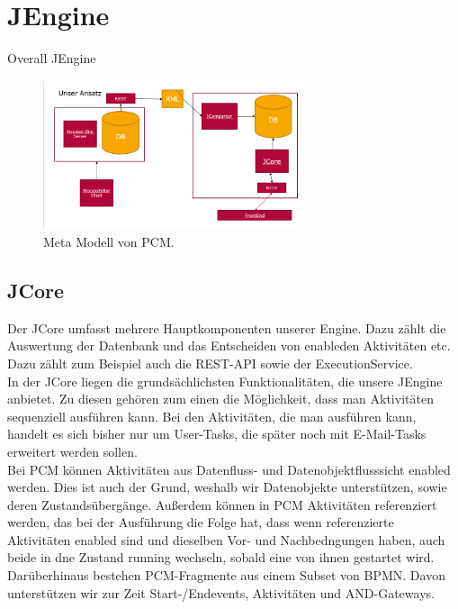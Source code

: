 \documentclass{template/ecsreport}      %
\begin{document}
%
%
\section{JEngine}
Overall JEngine

\begin{figure}
\centering
\includegraphics[width=3in]{img/JEngine_overview.png}
\caption{Meta Modell von PCM.}
\label{fig:PCMmetaModell}
\end{figure}


%
%
\subsection{JCore}
Der JCore umfasst mehrere Hauptkomponenten unserer Engine. Dazu zählt die Auswertung der Datenbank und das Entscheiden von enableden Aktivitäten etc.\\
Dazu zählt zum Beispiel auch die REST-API sowie der ExecutionService.\\
In der JCore liegen die grundsächlichsten Funktionalitäten, die unsere JEngine anbietet. Zu diesen gehören zum einen die Möglichkeit, dass man Aktivitäten sequenziell ausführen kann. Bei den Aktivitäten, die man ausführen kann, handelt es sich bisher nur um User-Tasks, die später noch mit E-Mail-Tasks erweitert werden sollen.\\
Bei PCM können Aktivitäten aus Datenfluss- und Datenobjektflusssicht enabled werden. Dies ist auch der Grund, weshalb wir Datenobjekte unterstützen, sowie deren Zustandsübergänge. Außerdem können in PCM Aktivitäten referenziert werden, das bei der Ausführung die Folge hat, dass wenn referenzierte Aktivitäten enabled sind und dieselben Vor- und Nachbedngungen haben, auch beide in dne Zustand running wechseln, sobald eine von ihnen gestartet wird.\\
Darüberhinaus bestehen PCM-Fragmente aus einem Subset von BPMN. Davon unterstützen wir zur Zeit Start-/Endevents, Aktivitäten und AND-Gateways.

%
%
\end{document}
